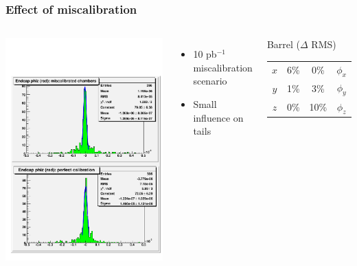 \documentclass[compress]{beamer}
\begin{document}
\begin{frame}
\frametitle{Effect of miscalibration}
\begin{columns}
\includegraphics[width=\linewidth]{miscal_endcap_phiz.pdf}


\vspace{-1.2 cm}
\begin{itemize}
\item 10 pb$^{-1}$ miscalibration scenario
\item Small influence on tails
\end{itemize}

\begin{center}
Barrel ($\Delta$ RMS)

\vspace{0.05 cm}
\renewcommand{\arraystretch}{1.2}
\begin{tabular}{c c | c c}
\hline\hline
$x$ & 6\% & 0\% & $\phi_x$ \\
$y$ & 1\% & 3\% & $\phi_y$ \\
$z$ & 0\% & 10\% & $\phi_z$ \\
\hline\hline
\end{tabular}


\end{center}
\end{columns}
\end{frame}
\end{document}
